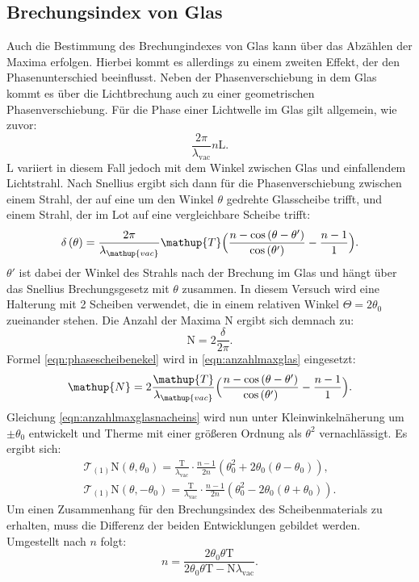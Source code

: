 \documentclass[
  bibliography=totoc,     %
  captions=tableheading,  %
  titlepage=firstiscover, %
]{scrartcl}
\begin{document}
\subsection{Brechungsindex von Glas}
\label{sub:brechglas}
Auch die Bestimmung des Brechungindexes von Glas kann über das Abzählen der Maxima erfolgen.
Hierbei kommt es allerdings zu einem zweiten Effekt, der den Phasenunterschied beeinflusst.
Neben der Phasenverschiebung in dem Glas kommt es über die Lichtbrechung auch
zu einer geometrischen Phasenverschiebung.
Für die Phase einer Lichtwelle im Glas gilt allgemein, wie zuvor:
\begin{equation}
  \frac{2\pi}{\lambda_\mathup{vac}}n\mathup{L}.
  \label{eqn:phaseallg}
\end{equation}
$\mathup{L}$ variiert in diesem Fall jedoch mit dem Winkel zwischen Glas und einfallendem
Lichtstrahl. Nach Snellius ergibt sich dann für die Phasenverschiebung zwischen
einem Strahl, der auf eine um den Winkel $\theta$ gedrehte Glasscheibe trifft,
und einem Strahl, der im Lot auf eine vergleichbare Scheibe trifft:
\begin{equation}
  \delta\left(\theta\right) = \frac{2\pi}{\lambda_\mathup{vac}}\mathup{T}\Bigl(\frac{n-\cos\left(\theta-\theta'\right)}{\cos\left(\theta'\right)}-\frac{n-1}{1}\Bigr).
  \label{eqn:phasescheibenekel}
\end{equation}
$\theta'$ ist dabei der Winkel des Strahls nach der Brechung im Glas und hängt über
das Snellius Brechungsgesetz mit $\theta$ zusammen.
In diesem Versuch wird eine Halterung mit 2 Scheiben verwendet, die in einem relativen
Winkel $\Theta = 2 \theta_0$ zueinander stehen.
Die Anzahl der Maxima $\mathup{N}$ ergibt sich demnach zu:
\begin{equation}
  \mathup{N} = 2\frac{\delta}{2\pi}.
  \label{eqn:anzahlmaxglas}
\end{equation}
Formel \eqref{eqn:phasescheibenekel} wird in \eqref{eqn:anzahlmaxglas} eingesetzt:
\begin{equation}
  \mathup{N} = 2\frac{\mathup{T}}{\lambda_\mathup{vac}}\Bigl(\frac{n-\cos\left(\theta-\theta'\right)}{\cos\left(\theta'\right)}-\frac{n-1}{1}\Bigr).
  \label{eqn:anzahlmaxglasnacheins}
\end{equation}
Gleichung \eqref{eqn:anzahlmaxglasnacheins} wird nun unter Kleinwinkelnäherung um $\pm \theta_0$ entwickelt
und Therme mit einer größeren Ordnung als $\theta^2$ vernachlässigt.
Es ergibt sich:
\begin{gather*}
  \mathcal{T}_{(1)}\mathup{N}(\theta,\theta_0) = \frac{\mathup{T}}{\lambda_\mathup{vac}}\cdot\frac{n-1}{2n}(\theta_0^2 + 2\theta_0(\theta-\theta_0)),\\
  \mathcal{T}_{(1)}\mathup{N}(\theta,-\theta_0) = \frac{\mathup{T}}{\lambda_\mathup{vac}}\cdot\frac{n-1}{2n}(\theta_0^2 - 2\theta_0(\theta+\theta_0)).
\end{gather*}
Um einen Zusammenhang für den Brechungsindex des Scheibenmaterials zu erhalten, muss
die Differenz der beiden Entwicklungen gebildet werden. Umgestellt nach $n$ folgt:
\begin{equation}
  n = \frac{2\theta_0\theta\mathup{T}}{2\theta_0\theta\mathup{T}-\mathup{N}\lambda_\mathup{vac}}.
\label{A_eqn:3}
\end{equation}
\clearpage
\end{document}
